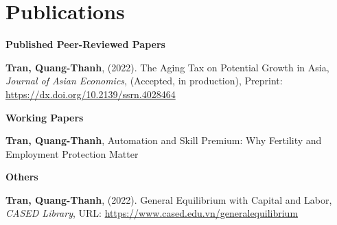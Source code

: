 
\section{\sc Publications}
{\bf Published Peer-Reviewed Papers}
\vspace*{.05in}
\begin{etaremune}[]
\item
  {\bf Tran, Quang-Thanh},
  (2022).
  {The Aging Tax on Potential Growth in Asia},
  {\it Journal of Asian Economics},
  {(Accepted, in production)},
  {Preprint: \url{https://dx.doi.org/10.2139/ssrn.4028464}}
\end{etaremune}

{\bf Working Papers}
\vspace*{.05in}
\begin{etaremune}[]
\item
  {\bf Tran, Quang-Thanh},
  {Automation and Skill Premium: Why Fertility and Employment Protection Matter}
\end{etaremune}

{\bf Others}
\vspace*{.05in}
\vspace*{.05in}
\begin{etaremune}[]
\item
  {\bf Tran, Quang-Thanh},
  (2022).
  {General Equilibrium with Capital and Labor},
  {\it CASED Library},
  {URL: \url{https://www.cased.edu.vn/generalequilibrium}}
\end{etaremune}

